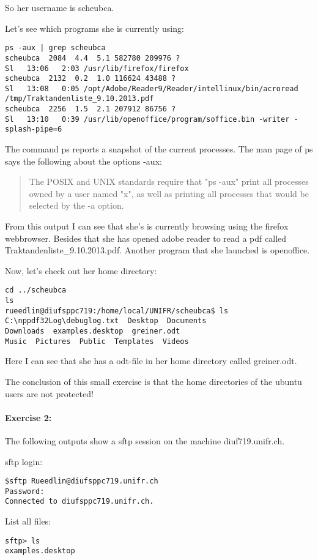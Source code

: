 \documentclass[12pt]{article}
\begin{document}
So her username is scheubca.

Let's see which programs she is currently using:

\begin{lstlisting}
ps -aux | grep scheubca
scheubca  2084  4.4  5.1 582780 209976 ?       
Sl   13:06   2:03 /usr/lib/firefox/firefox
scheubca  2132  0.2  1.0 116624 43488 ?        
Sl   13:08   0:05 /opt/Adobe/Reader9/Reader/intellinux/bin/acroread 
/tmp/Traktandenliste_9.10.2013.pdf
scheubca  2256  1.5  2.1 207912 86756 ?        
Sl   13:10   0:39 /usr/lib/openoffice/program/soffice.bin -writer -splash-pipe=6
\end{lstlisting}

The command ps reports a snapshot of the current processes. The man page of ps says the following about the options -aux:
\begin{quote}
The POSIX and UNIX standards require
       that "ps -aux" print all processes owned by a user named "x", as well as printing all
       processes that would be selected by the -a option. 
\end{quote}
 
From this output I can see that she's is currently browsing using the firefox webbrowser. Besides that she has opened adobe reader to read a pdf called Traktandenliste\_9.10.2013.pdf. Another program that she launched is openoffice.

Now, let's check out her home directory:
\begin{lstlisting}
cd ../scheubca
ls
rueedlin@diufsppc719:/home/local/UNIFR/scheubca$ ls
C:\nppdf32Log\debuglog.txt  Desktop  Documents  
Downloads  examples.desktop  greiner.odt  
Music  Pictures  Public  Templates  Videos
\end{lstlisting}

Here I can see that she has a odt-file in her home directory called greiner.odt.

The conclusion of this small exercise is that the home directories of the ubuntu users are not protected!
\paragraph*{Exercise 2:}
The following outputs show a sftp session on the machine diuf719.unifr.ch.

sftp login:
\begin{lstlisting}
$sftp Rueedlin@diufsppc719.unifr.ch
Password:
Connected to diufsppc719.unifr.ch.
\end{lstlisting}
List all files:
\begin{lstlisting}
sftp> ls
examples.desktop    
\end{lstlisting}
\end{document}
